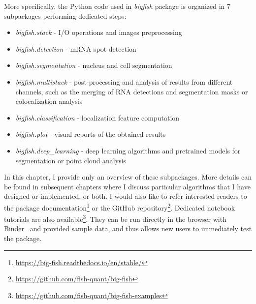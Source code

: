 More specifically, the Python code used in \emph{bigfish} package is organized in 7 subpackages performing dedicated steps:
\begin{itemize}
	\setlength\itemsep{0.1em}
	\item \emph{bigfish.stack} - I/O operations and images preprocessing
	\item \emph{bigfish.detection} - \ac{mRNA} spot detection
	\item \emph{bigfish.segmentation} - nucleus and cell segmentation
	\item \emph{bigfish.multistack} - post-processing and analysis of results from different channels, such as the merging of \ac{RNA} detections and segmentation masks or colocalization analysis
	\item \emph{bigfish.classification} - localization feature computation
	\item \emph{bigfish.plot} - visual reports of the obtained results
	\item \emph{bigfish.deep\_learning} - deep learning algorithms and pretrained models for segmentation or point cloud analysis
\end{itemize}

In this chapter, I provide only an overview of these subpackages.
More details can be found in subsequent chapters where I discuss particular algorithms that I have designed or implemented, or both.
I would also like to refer interested readers to the package documentation\footnote{\url{https://big-fish.readthedocs.io/en/stable/}} or the GitHub repository\footnote{\url{https://github.com/fish-quant/big-fish}}.
Dedicated notebook tutorials are also available\footnote{\url{https://github.com/fish-quant/big-fish-examples}}.
They can be run directly in the browser with Binder~\cite{Jupyter2018Binder2} and provided sample data, and thus allows new users to immediately test the package.

